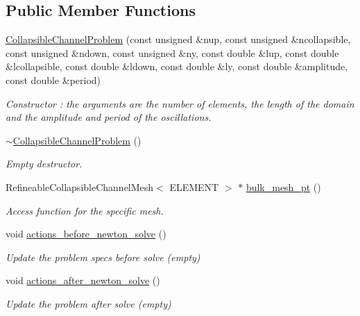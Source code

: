 \subsection*{Public Member Functions}
\begin{DoxyCompactItemize}
\item 
\hyperlink{classCollapsibleChannelProblem_ab43fa30667f57e8019c8b30fd93156f8}{Collapsible\+Channel\+Problem} (const unsigned \&nup, const unsigned \&ncollapsible, const unsigned \&ndown, const unsigned \&ny, const double \&lup, const double \&lcollapsible, const double \&ldown, const double \&ly, const double \&amplitude, const double \&period)
\begin{DoxyCompactList}\small\item\em Constructor \+: the arguments are the number of elements, the length of the domain and the amplitude and period of the oscillations. \end{DoxyCompactList}\item 
\hyperlink{classCollapsibleChannelProblem_a205e3e654d3205d1d55ac46e7b63ca9d}{$\sim$\+Collapsible\+Channel\+Problem} ()
\begin{DoxyCompactList}\small\item\em Empty destructor. \end{DoxyCompactList}\item 
Refineable\+Collapsible\+Channel\+Mesh$<$ E\+L\+E\+M\+E\+NT $>$ $\ast$ \hyperlink{classCollapsibleChannelProblem_a49a428b5f489d11b3fb92199b72f6dd7}{bulk\+\_\+mesh\+\_\+pt} ()
\begin{DoxyCompactList}\small\item\em Access function for the specific mesh. \end{DoxyCompactList}\item 
void \hyperlink{classCollapsibleChannelProblem_ad7597f95eb755184ec1f9581c713ff78}{actions\+\_\+before\+\_\+newton\+\_\+solve} ()
\begin{DoxyCompactList}\small\item\em Update the problem specs before solve (empty) \end{DoxyCompactList}\item 
void \hyperlink{classCollapsibleChannelProblem_a34299672cba0f3c1db3901427eb4da4a}{actions\+\_\+after\+\_\+newton\+\_\+solve} ()
\begin{DoxyCompactList}\small\item\em Update the problem after solve (empty) \end{DoxyCompactList}\item 

\end{DoxyCompactItemize}
